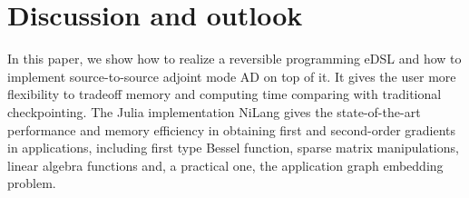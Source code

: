\documentclass{article}
\newcommand{\<}{\langle}
\renewcommand{\>}{\rangle}
\newcommand{\ra}[1]{\renewcommand{\arraystretch}{#1}}
\theoremstyle{definition}\newtheorem{definition}{\textit{Definition}}
\begin{document}
\begin{table}[h!]\centering
    \scriptsize
\begin{minipage}{\columnwidth}
\ra{1.3}
    \caption{Absolute runtimes for bundle adjustment with 10k data points.}\label{tbl:interp}
\end{minipage}
\end{table}



\section{Discussion and outlook}\label{sec:discussion}
In this paper, we show how to realize a reversible programming eDSL and how to implement source-to-source adjoint mode AD on top of it.
It gives the user more flexibility to tradeoff memory and computing time comparing with traditional checkpointing.
The Julia implementation NiLang gives the state-of-the-art performance and memory efficiency in obtaining first and second-order gradients in applications, including first type Bessel function, sparse matrix manipulations, linear algebra functions and, a practical one, the application graph embedding problem.
\end{document}
